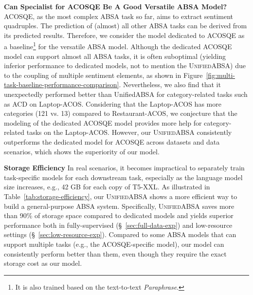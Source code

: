 \documentclass[11pt]{article}
\newcommand{\UnifiedABSA}{\textsc{UnifiedABSA}\xspace}
\begin{document}
\noindent\textbf{Can Specialist for ACOSQE Be A Good Versatile ABSA Model?} \quad ACOSQE, as the most complex ABSA task so far, aims to extract sentiment quadruples. The prediction of (almost) all other ABSA tasks can be derived from its predicted results. Therefore, we consider the model dedicated to ACOSQE as a baseline\footnote{It is also trained based on the text-to-text \emph{Paraphrase}.} for the versatile ABSA model. Although the dedicated ACOSQE model can support almost all ABSA tasks, it is often suboptimal (yielding inferior performance to dedicated models, not to mention the \UnifiedABSA) due to the coupling of multiple sentiment elements, as shown in Figure~\ref{fig:multi-task-baseline-performance-comparison}. Nevertheless, we also find that it unexpectedly performed better than UnifiedABSA for category-related tasks such as ACD on Laptop-ACOS. Considering that the Laptop-ACOS has more categories (121 vs. 13) compared to Restaurant-ACOS, we conjecture that the modeling of the dedicated ACOSQE model provides more help for category-related tasks on the Laptop-ACOS. However, our \UnifiedABSA consistently outperforms the dedicated model for ACOSQE across datasets and data scenarios, which shows the superiority of our model.



\begin{table}[h]
\centering

\caption{Comparison of the storage space required by different models to support 11 ABSA tasks.  denotes the storage space size occupied by T5.}
\label{tab:storage-efficiency}
\end{table}
 

\noindent\textbf{Storage Efficiency} \quad In real scenarios, it becomes impractical to separately train task-specific models for each downstream task, especially as the language model size increases, e.g., 42 GB for each copy of T5-XXL. As illustrated in Table~\ref{tab:storage-efficiency}, our \UnifiedABSA shows a more efficient way to build a general-purpose ABSA system. Specifically, \UnifiedABSA saves more than 90\% of storage space compared to dedicated models and yields superior performance both in fully-supervised (\S~\ref{sec:full-data-exp}) and low-resource settings (\S~\ref{sec:low-resource-exp}). Compared to some ABSA models that can support multiple tasks (e.g., the ACOSQE-specific model), our model can consistently perform better than them, even though they require the exact storage cost as our model.
\end{document}
